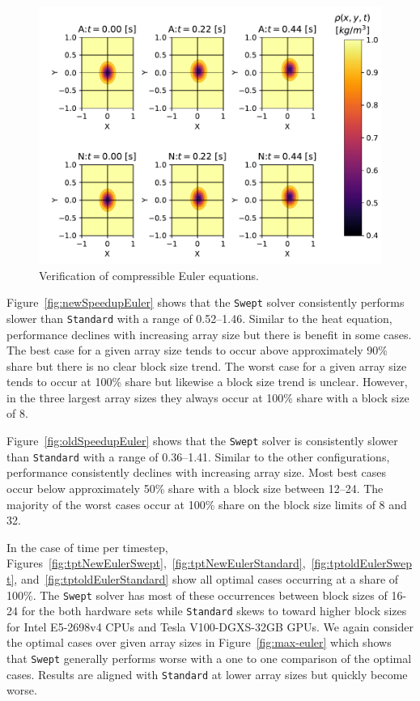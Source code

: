 \documentclass[mca,article,submit,moreauthors,pdftex]{Definitions/mdpi}
\def\Swept{\texttt{Swept}}
\def\Standard{\texttt{Standard}}
\def\newCPU{Intel E5-2698v4} %
\def\newGPU{Tesla V100-DGXS-32GB}
\begin{document}
\begin{figure}[htbp]
\widefigure
    \includegraphics[scale=0.85,trim={0.45cm 0.3cm 0.1cm 0.9cm},clip]{figs/eulerValidate.pdf}
    \caption{Verification of compressible Euler equations.}
    \label{fig:eulerSurface}
\end{figure}
\begin{paracol}{2}
\linenumbers
\switchcolumn

Figure~\ref{fig:newSpeedupEuler} shows that the \Swept{} solver consistently performs slower than \Standard{} with a range of 0.52--1.46. Similar to the heat equation, performance declines with increasing array size but there is benefit in some cases. The best case for a given array size tends to occur above approximately 90\% share but there is no clear block size trend. The worst case for a given array size tends to occur at 100\% share but likewise a block size trend is unclear. However, in the three largest array sizes they always occur at 100\% share with a block size of 8. 

Figure~\ref{fig:oldSpeedupEuler} shows that the \Swept{} solver is consistently slower than \Standard{} with a range of 0.36--1.41. Similar to the other configurations, performance consistently declines with increasing array size. Most best cases occur below approximately 50\% share with a block size between 12--24. The majority of the worst cases occur at 100\% share on the block size limits of 8 and 32.

In the case of time per timestep, Figures~\ref{fig:tptNewEulerSwept},~\ref{fig:tptNewEulerStandard},~\ref{fig:tptoldEulerSwept}, and~\ref{fig:tptoldEulerStandard} show all optimal cases occurring at a share of 100\%. The \Swept{} solver has most of these occurrences between block sizes of 16-24 for the both hardware sets while \Standard{} skews to toward higher block sizes for \newCPU{} CPUs and \newGPU{} GPUs. We again consider the optimal cases over given array sizes in Figure~\ref{fig:max-euler} which shows that \Swept{} generally performs worse with a one to one comparison of the optimal cases. Results are aligned with \Standard{} at lower array sizes but quickly become worse.

\end{paracol}
\nointerlineskip
\end{document}
